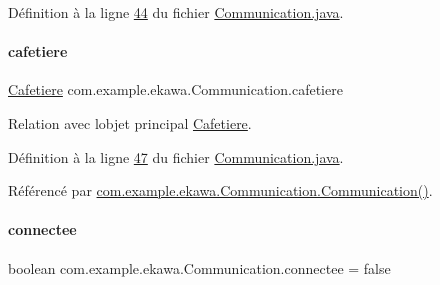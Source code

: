 Définition à la ligne \hyperlink{_communication_8java_source_l00044}{44} du fichier \hyperlink{_communication_8java_source}{Communication.\+java}.

\mbox{\label{classcom_1_1example_1_1ekawa_1_1_communication_a3b69b78cdf60bc35b2e3e564519dc1b6}} 
\paragraph{\texorpdfstring{cafetiere}{cafetiere}}
{\footnotesize\ttfamily \hyperlink{classcom_1_1example_1_1ekawa_1_1_cafetiere}{Cafetiere} com.\+example.\+ekawa.\+Communication.\+cafetiere\hspace{0.3cm}{\ttfamily [private]}}



Relation avec l\textquotesingle{}objet principal \hyperlink{classcom_1_1example_1_1ekawa_1_1_cafetiere}{Cafetiere}. 



Définition à la ligne \hyperlink{_communication_8java_source_l00047}{47} du fichier \hyperlink{_communication_8java_source}{Communication.\+java}.



Référencé par \hyperlink{_communication_8java_source_l00195}{com.\+example.\+ekawa.\+Communication.\+Communication()}.

\mbox{\label{classcom_1_1example_1_1ekawa_1_1_communication_a93d9caaa9d4454a32d9dc28a6f22d2eb}} 
\paragraph{\texorpdfstring{connectee}{connectee}}
{\footnotesize\ttfamily boolean com.\+example.\+ekawa.\+Communication.\+connectee = false\hspace{0.3cm}{\ttfamily [private]}}



